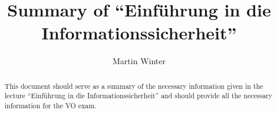 \documentclass[a4paper, 10 pt, conference]{ieeeconf}
\title{\LARGE \bf Summary of ``Einführung in die Informationssicherheit''}
\author{Martin Winter}
\begin{document}
\maketitle
\thispagestyle{empty}
\pagestyle{empty}


\begin{abstract}

This document should serve as a summary of the necessary information given in the lecture ``Einführung in die Informationssicherheit'' and should provide all the necessary information for the VO exam.

\end{abstract}



\end{document}
